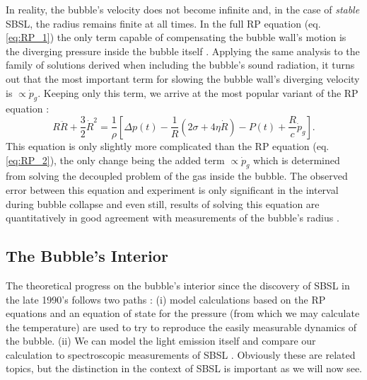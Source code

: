\documentclass[prb,aps,nofootinbib,superscriptaddress,floatfix]{revtex4-2}
\begin{document}
In reality, the bubble's velocity does not become infinite and, in the case of \emph{stable} SBSL, the radius remains finite at all times. In the full RP equation (eq. \ref{eq:RP_1}) the only term capable of compensating the bubble wall's motion is the diverging pressure inside the bubble itself \cite{brenner2002single}. Applying the same analysis to the family of solutions derived when including the bubble's sound radiation, it turns out that the most important term for slowing the bubble wall's diverging velocity is $\propto\dot{p}_g$. Keeping only this term, we arrive at the most popular variant of the RP equation \cite{lofstedt1995sonoluminescing,barber1997defining}:
\begin{equation}
    R\ddot{R}+\frac{3}{2}\dot{R}^2 = \frac{1}{\rho} \left[ \Delta p(t)-\frac{1}{R}\left( 2\sigma+4\eta \dot{R} \right)-P(t) +\frac{R}{c} \dot{p}_g \right].
    \label{eq:RP_3}
\end{equation}
This equation is only slightly more complicated than the RP equation (eq. \ref{eq:RP_2}), the only change being the added term $\propto \dot{p}_g$ which is determined from solving the decoupled problem of the gas inside the bubble. The observed error between this equation and experiment is only significant in the interval during bubble collapse and even still, results of solving this equation are quantitatively in good agreement with measurements of the bubble's radius \cite{brenner2002single}. 


\subsection{The Bubble's Interior}
The theoretical progress on the bubble's interior since the discovery of SBSL in the late 1990's \cite{gaitan1992sonoluminescence} follows two paths \cite{brenner2002single,suslick2008inside,yasui2018acoustic}: (i) model calculations based on the RP equations and an equation of state for the pressure (from which we may calculate the temperature) are used to try to reproduce the easily measurable dynamics of the bubble. (ii) We can model the light emission itself and compare our calculation to spectroscopic measurements of SBSL \cite{hiller1992spectrum,brenner2002single}. Obviously these are related topics, but the distinction in the context of SBSL is important as we will now see.
\end{document}

